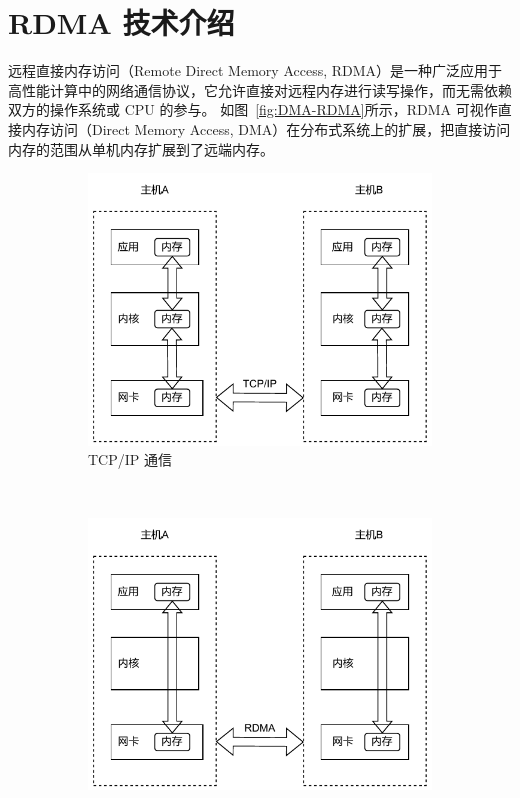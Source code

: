 {    \section{RDMA 技术介绍}\label{RDMA 技术介绍}
    远程直接内存访问（Remote Direct Memory Access, RDMA）是一种广泛应用于高性能计算中的网络通信协议，它允许直接对远程内存进行读写操作，而无需依赖双方的操作系统或 CPU 的参与。
    如图~\ref{fig:DMA-RDMA}所示，RDMA 可视作直接内存访问（Direct Memory Access, DMA）在分布式系统上的扩展，把直接访问内存的范围从单机内存扩展到了远端内存。
    \begin{figure}[!htbp]
        \centering
        \begin{subfigure}[b]{0.50\textwidth}
            \includegraphics[width=\textwidth]{Img/TCP_IP通信.drawio.pdf}
            \caption{TCP/IP 通信}
            \label{fig:TCPIP}
        \end{subfigure}%
        ~~~~~%
        \begin{subfigure}[b]{0.50\textwidth}
            \includegraphics[width=\textwidth]{Img/RDMA通信.drawio.pdf}

\end{subfigure}
\end{figure}}
